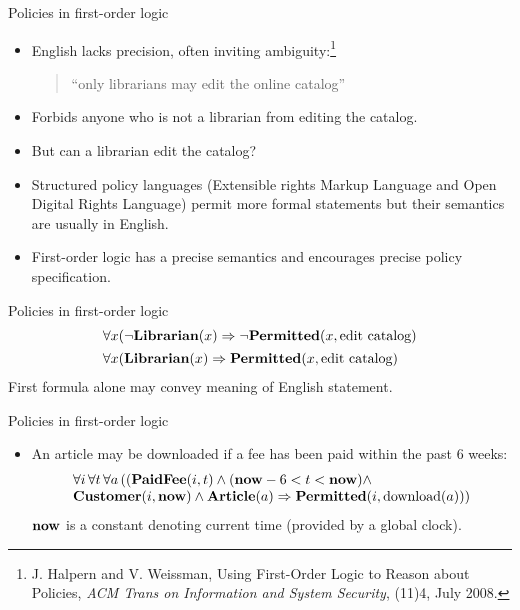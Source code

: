 \documentclass[style=sailor,size=12pt]{powerdot}
\newcommand{\rid}[1]{\mbox{\rm #1}}
\newcommand{\bid}[1]{\mbox{\bf #1}}
\theoremstyle{definition}
\begin{document}
\begin{wideslide}[bm=,toc=]{Policies in first-order logic}
\begin{itemize}
\item English lacks precision, often inviting ambiguity:\footnote{
J. Halpern and V. Weissman, 
Using First-Order Logic to Reason about Policies, {\em ACM Trans on Information and System Security\/},
(11)4, July 2008.}
\begin{quote}
``only librarians may edit the online catalog''
\end{quote}
\item Forbids anyone who is not a librarian from editing the catalog.
\item But can a librarian edit the catalog?
\item Structured policy languages (Extensible rights Markup Language and Open Digital Rights Language)
permit more formal statements but their semantics are usually in English.
\item First-order logic has a precise semantics and encourages precise policy specification.
\end{itemize}
\end{wideslide}

\begin{wideslide}[bm=,toc=]{Policies in first-order logic}
\begin{displaymath}
\begin{array}{l}
\forall x(\neg\bid{Librarian}(x)\Rightarrow \neg\bid{Permitted}(x,\rid{edit catalog}) \\[1ex]
\forall x(\bid{Librarian}(x)\Rightarrow \bid{Permitted}(x,\rid{edit catalog})
\end{array}
\end{displaymath}
First formula alone may convey meaning of English statement.
\end{wideslide}

\begin{wideslide}[bm=,toc=]{Policies in first-order logic}
\begin{itemize}
\item An article may be downloaded if a fee has been paid within the past 6 weeks:
\begin{displaymath}
\begin{array}{l}
\forall i\, \forall t\, \forall a\, ((\bid{PaidFee}(i,t)\wedge (\bid{now} - 6 < t < \bid{now})\wedge \\
\bid{Customer}(i,\bid{now})\wedge\bid{Article}(a) \Rightarrow \bid{Permitted}(i,\rid{download}(a)))
\end{array}
\end{displaymath}
$\bid{now}$ is a constant denoting current time (provided by a global clock).
\end{itemize}
\end{wideslide}
\end{document}
